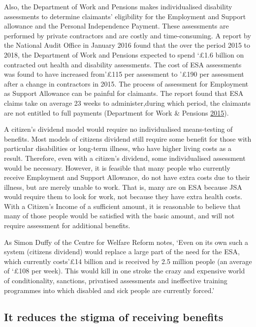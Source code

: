 \documentclass[]{tufte-handout}
\begin{document}
Also, the Department of Work and Pensions makes individualised
disability assessments to determine claimants' eligibility for the
Employment and Support allowance and the Personal Independence Payment.
These assessments are performed by private contractors and are costly
and time-consuming. A report by the National Audit Office in January
2016 found that the over the period 2015 to 2018, the Department of Work
and Pensions expected to spend `£1.6 billion on contracted out health
and disability assessments. The cost of ESA assessments was found to
have increased from'£115 per assessment to '£190 per assessment after a
change in contractors in 2015. The process of assessment for Employment
as Support Allowance can be painful for claimants. The report found that
ESA claims take on average 23 weeks to administer,during which period,
the claimants are not entitled to full payments (Department for Work \&
Pensions \protect\hyperlink{ref-DeptForWorkAndPensions2015}{2015}).

A citizen's dividend model would require no individualised means-testing
of benefits. Most models of citizens dividend still require some benefit
for those with particular disabilities or long-term illness, who have
higher living costs as a result. Therefore, even with a citizen's
dividend, some individualised assessment would be necessary. However, it
is feasible that many people who currently receive Employment and
Support Allowance, do not have extra costs due to their illness, but are
merely unable to work. That is, many are on ESA because JSA would
require them to look for work, not because they have extra health costs.
With a Citizen's Income of a sufficient amount, it is reasonable to
believe that many of those people would be satisfied with the basic
amount, and will not require assessment for additional benefits.

As Simon Duffy of the Centre for Welfare Reform notes, `Even on its own
such a system (citizens dividend) would replace a large part of the need
for the ESA, which currently costs'£14 billion and is received by 2.5
million people (an average of `£108 per week). This would kill in one
stroke the crazy and expensive world of conditionality, sanctions,
privatised assessments and ineffective training programmes into which
disabled and sick people are currently forced.'

\hypertarget{it-reduces-the-stigma-of-receiving-benefits}{%
\subsection{It reduces the stigma of receiving
benefits}\label{it-reduces-the-stigma-of-receiving-benefits}}
\end{document}
